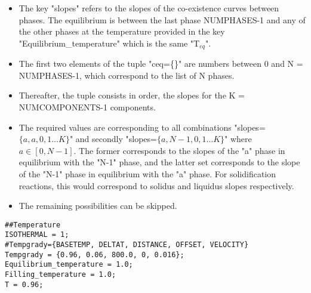 \documentclass[a4paper,10pt]{article}
\begin{document}
\begin{itemize}
\item The key "slopes" refers to the slopes of the co-existence curves between phases. The equilibrium is between the last phase 
NUMPHASES-1 and any of the other phases at the temperature provided in the key "Equilibrium\_temperature" which is the same "T$_{eq}$".
\item The first two elements of the tuple "ceq=\{\}" are numbers between 0 and N = NUMPHASES-1, which correspond 
to the list of N phases.
\item Thereafter, the tuple consists in order, the slopes for the K = NUMCOMPONENTS-1 components.
\item The required values are corresponding to all combinations "slopes=$\{a, a, 0, 1\ldots K\}$"
and secondly "slopes=$\{a, N-1, 0, 1\ldots K\}$" where $a\in \left[0,N-1\right]$. The former corresponds
to the slopes of the "a" phase in equilibrium with the "N-1" phase, and the latter set 
corresponds to the slope of the "N-1" phase  in equilibrium with the "a" phase.
For solidification reactions, this would correspond to solidus and liquidus slopes respectively.

\item The remaining possibilities can be skipped.
\end{itemize}

\begin{lstlisting}
##Temperature
ISOTHERMAL = 1;
#Tempgrady={BASETEMP, DELTAT, DISTANCE, OFFSET, VELOCITY}
Tempgrady = {0.96, 0.06, 800.0, 0, 0.016};
Equilibrium_temperature = 1.0;
Filling_temperature = 1.0;
T = 0.96;
\end{lstlisting}
\end{document}
